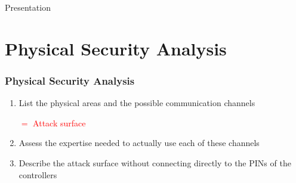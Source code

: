 \begin{reveals}
\begin{frame}[c]{Presentation}
\end{frame}


\section{Physical Security Analysis}





\begin{frame}
  \frametitle{Physical Security Analysis}

  \begin{enumerate}[<+->]
  \item List the physical areas and the possible communication
    channels
    \begin{center}
    \textcolor{red}{\(=\) Attack surface}
    \end{center}
  \item Assess the expertise needed to actually use each of these channels
    \begin{center}
    \end{center}
  \item Describe the attack surface without connecting directly to the
    PINs of the controllers
  \end{enumerate}

\end{frame}

\end{reveals}
